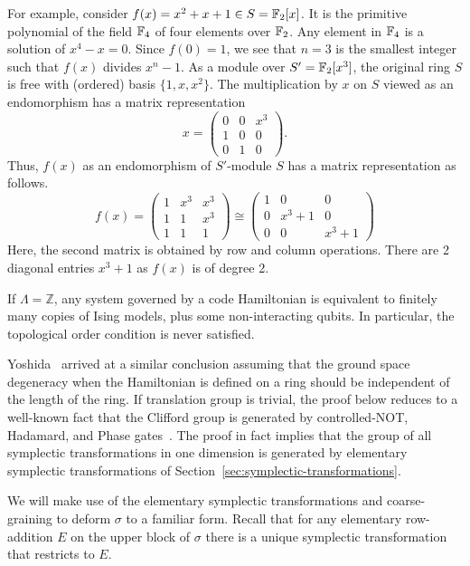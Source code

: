 For example, consider $f(x) = x^2 + x + 1 \in S = \mathbb{F}_2[x]$.
It is the primitive polynomial of the field $\mathbb{F}_4$ of four elements over $\mathbb{F}_2$.
Any element in $\mathbb{F}_4$ is a solution of $x^4-x=0$.
Since $f(0) = 1$, we see that $n=3$ is the smallest integer such that $f(x)$ divides $x^n-1$.
As a module over $S' = \mathbb{F}_2[x^3]$, the original ring $S$ is free with (ordered) basis $\{1, x, x^2\}$.
The multiplication by $x$ on $S$ viewed as an endomorphism has a matrix representation
\[
x = 
 \begin{pmatrix}
  0 & 0 & x^3 \\
  1 & 0 & 0   \\
  0 & 1 & 0   
 \end{pmatrix} .
\]
Thus, $f(x)$ as an endomorphism of $S'$-module $S$ has a matrix representation as follows.
\[
 f(x) =
 \begin{pmatrix}
  1 & x^3 & x^3 \\
  1 & 1   & x^3 \\
  1 & 1   & 1  
 \end{pmatrix} 
\cong
 \begin{pmatrix}
  1 & 0      & 0 \\
  0 & x^3 +1 & 0 \\
  0 & 0      & x^3 +1
 \end{pmatrix}
\]
Here, the second matrix is obtained by row and column operations.
There are 2 diagonal entries $x^3+1$ as $f(x)$ is of degree 2.

\begin{theorem}
If $\Lambda = \mathbb{Z}$,
any system governed by a code Hamiltonian
is equivalent to finitely many copies of Ising models,
plus some non-interacting qubits.
In particular, the topological order condition is never satisfied.
\label{thm:1D-classification}
\end{theorem}
\noindent
Yoshida~\cite{Yoshida2011Classification} arrived at a similar conclusion
assuming that the ground space degeneracy when the Hamiltonian is defined on a ring 
should be independent of the length of the ring.
If translation group is trivial,
the proof below reduces to a well-known fact that 
the Clifford group is generated by controlled-NOT, Hadamard, and Phase
gates~\cite[Proposition~15.7]{KitaevShenVyalyi2002CQC}.
The proof in fact implies that the group of all symplectic transformations
in one dimension is generated by elementary symplectic transformations
of Section~\ref{sec:symplectic-transformations}.

We will make use of the elementary symplectic transformations
and coarse-graining to deform $\sigma$ to a familiar form.
Recall that for any elementary row-addition $E$ on the upper block of $\sigma$
there is a unique symplectic transformation that restricts to $E$.


